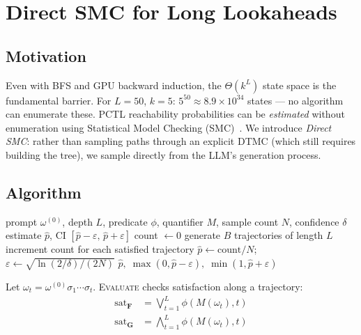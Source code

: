 \documentclass{article}
\newcommand{\eps}{\varepsilon}
\begin{document}
\section{Direct SMC for Long Lookaheads}
\label{sec:dsmc}

\subsection{Motivation}

Even with BFS and GPU backward induction, the $\Theta(k^L)$ state space is the
fundamental barrier.
For $L{=}50$, $k{=}5$: $5^{50} \approx 8.9 \times 10^{34}$ states — no
algorithm can enumerate these.
PCTL reachability probabilities can be \emph{estimated} without enumeration
using Statistical Model Checking (SMC)~\citep{younes2002probabilistic,legay2010statistical}.
We introduce \emph{Direct SMC}: rather than sampling paths through an explicit
DTMC (which still requires building the tree), we sample directly from the
LLM's generation process.

\subsection{Algorithm}

\begin{algorithm}[tb]
\caption{Direct SMC for long-lookahead PCTL}
\label{alg:dsmc}
\begin{algorithmic}[1]
\Require prompt $\omega^{(0)}$, depth $L$, predicate $\phi$, quantifier $M$,
         sample count $N$, confidence $\delta$
\Ensure estimate $\hat{p}$, CI $[\hat{p}{-}\eps,\,\hat{p}{+}\eps]$
\State count $\gets 0$
  \State generate $B$ trajectories of length $L$ 
  \State increment count for each satisfied trajectory
\EndFor
\State $\hat{p} \gets \text{count}/N$;\quad
       $\eps \gets \sqrt{\ln(2/\delta)/(2N)}$
\Return $\hat{p},\;\max(0,\hat{p}{-}\eps),\;\min(1,\hat{p}{+}\eps)$
\end{algorithmic}
\end{algorithm}

Let $\omega_t = \omega^{(0)}\sigma_1\cdots\sigma_t$.
\textsc{Evaluate} checks satisfaction along a trajectory:
\begin{align}
  \text{sat}_{\mathbf{F}} &= \textstyle\bigvee_{t=1}^{L} \phi(M(\omega_t), t) \label{eq:sat-F}\\
  \text{sat}_{\mathbf{G}} &= \textstyle\bigwedge_{t=1}^{L} \phi(M(\omega_t), t) \label{eq:sat-G}
\end{align}
\end{document}

